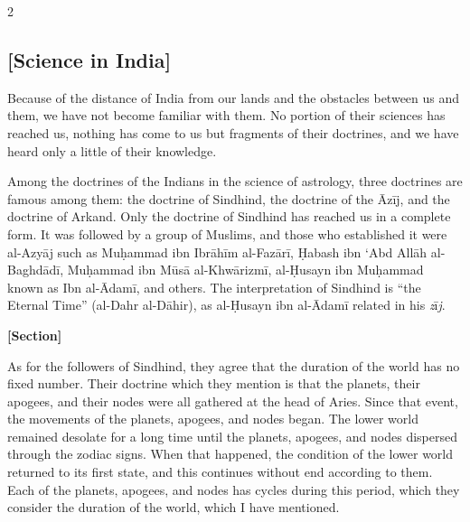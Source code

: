 \documentclass[11pt,a4paper]{article}
\begin{document}
\begin{paracol}{2}
\begin{rightcolumn}
\subsection*{[Science in India]}
\vspace{0.3cm}
Because of the distance of India from our lands and the obstacles between us and them, we have not become familiar with them. No portion of their sciences has reached us, nothing has come to us but fragments of their doctrines, and we have heard only a little of their knowledge.

\vspace{0.3cm}
Among the doctrines of the Indians in the science of astrology, three doctrines are famous among them: the doctrine of Sindhind, the doctrine of the \={A}z\={i}j, and the doctrine of Arkand. Only the doctrine of Sindhind has reached us in a complete form. It was followed by a group of Muslims, and those who established it were al-Azy\={a}j such as Mu\d{h}ammad ibn Ibr\={a}h\={i}m al-Faz\={a}r\={i}, \d{H}abash ibn \textquoteleft Abd All\={a}h al-Baghd\={a}d\={i}, Mu\d{h}ammad ibn M\={u}s\={a} al-Khw\={a}rizm\={i}, al-\d{H}usayn ibn Mu\d{h}ammad known as Ibn al-\={A}dam\={i}, and others. The interpretation of Sindhind is ``the Eternal Time'' (al-Dahr al-D\={a}hir), as al-\d{H}usayn ibn al-\={A}dam\={i} related in his \textit{z}\={i}\textit{j}.

\vspace{0.4cm}
\textbf{[Section]}

\vspace{0.3cm}
As for the followers of Sindhind, they agree that the duration of the world has no fixed number. Their doctrine which they mention is that the planets, their apogees, and their nodes were all gathered at the head of Aries. Since that event, the movements of the planets, apogees, and nodes began. The lower world remained desolate for a long time until the planets, apogees, and nodes dispersed through the zodiac signs. When that happened, the condition of the lower world returned to its first state, and this continues without end according to them. Each of the planets, apogees, and nodes has cycles during this period, which they consider the duration of the world, which I have mentioned.
\end{rightcolumn}

\end{paracol}

\clearpage

\end{document}
